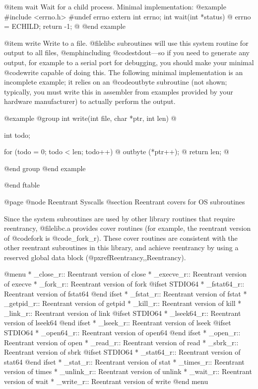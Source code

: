 @item wait
Wait for a child process.  Minimal implementation:
@example
#include <errno.h>
#undef errno
extern int errno;
int wait(int *status) @{
  errno = ECHILD;
  return -1;
@}
@end example

@item write
Write to a file.  @file{libc} subroutines will use this
system routine for output to all files, @emph{including}
@code{stdout}---so if you need to generate any output, for example to a
serial port for debugging, you should make your minimal @code{write}
capable of doing this.  The following minimal implementation is an
incomplete example; it relies on an @code{outbyte} subroutine (not
shown; typically, you must write this in assembler from examples
provided by your hardware manufacturer) to actually perform the output.

@example
@group
int write(int file, char *ptr, int len) @{
  int todo;

  for (todo = 0; todo < len; todo++) @{
    outbyte (*ptr++);
  @}
  return len;
@}
@end group
@end example

@end ftable

@page
@node Reentrant Syscalls
@section Reentrant covers for OS subroutines

Since the system subroutines are used by other library routines that
require reentrancy, @file{libc.a} provides cover routines (for example,
the reentrant version of @code{fork} is @code{_fork_r}).  These cover
routines are consistent with the other reentrant subroutines in this
library, and achieve reentrancy by using a reserved global data block
(@pxref{Reentrancy,,Reentrancy}).

@menu
* _close_r::	Reentrant version of close
* _execve_r::	Reentrant version of execve
* _fork_r::	Reentrant version of fork
@ifset STDIO64
* _fstat64_r::	Reentrant version of fstat64
@end ifset
* _fstat_r::	Reentrant version of fstat
* _getpid_r::	Reentrant version of getpid
* _kill_r::	Reentrant version of kill
* _link_r::	Reentrant version of link
@ifset STDIO64
* _lseek64_r::	Reentrant version of lseek64
@end ifset
* _lseek_r::	Reentrant version of lseek
@ifset STDIO64
* _open64_r::	Reentrant version of open64
@end ifset
* _open_r::	Reentrant version of open
* _read_r::	Reentrant version of read
* _sbrk_r::	Reentrant version of sbrk
@ifset STDIO64
* _stat64_r::	Reentrant version of stat64
@end ifset
* _stat_r::	Reentrant version of stat
* _times_r::	Reentrant version of times
* _unlink_r::	Reentrant version of unlink
* _wait_r::	Reentrant version of wait
* _write_r::	Reentrant version of write
@end menu


